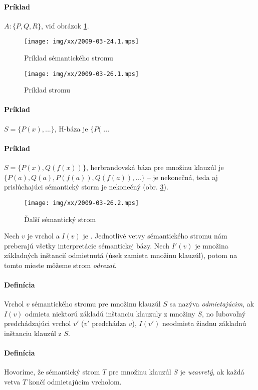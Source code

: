 \paragraph{Príklad} $A: \{ P, Q, R \}$, viď obrázok
\ref{fig-semantic_tree_example}.
\begin{figure}[h]
	\caption{Príklad sémantického stromu}
	\centering\texttt{[image: img/xx/2009-03-24.1.mps]}
	\label{fig-semantic_tree_example}
\end{figure}



\begin{figure}[h]
	\centering\texttt{[image: img/xx/2009-03-26.1.mps]}
	\caption{Príklad stromu}
	\label{0326_tree1}
\end{figure}
\paragraph{Príklad}
$S=\{P(x), ... \}$, H-báza je $\{P($ ... \todo{}

\paragraph{Príklad} $S=\{P(x), Q(f(x)) \}$, herbrandovská báza pre množinu
klauzúl je $\{ P(a), Q(a), P(f(a)), Q(f(a)), \ldots \}$ -- je nekonečná, teda aj
prislúchajúci sémantický storm je nekonečný (obr. \ref{0326_tree2}). %
\begin{figure}[h]
	\centering\texttt{[image: img/xx/2009-03-26.2.mps]}
	\caption{Ďalší sémantický strom}
	\label{0326_tree2}
\end{figure}

Nech $v$ je vrchol a $I(v)$ je \todo{}. Jednotlivé vetvy sémantického stromu nám
preberajú všetky interpretácie sémantickej bázy. Nech $I'(v)$ je množina
základných inštancií odmietnutá (úsek zamieta množinu klauzúl), potom na tomto
mieste môžeme strom \emph{odrezať}.

\paragraph{Definícia} Vrchol $v$ sémantického stromu pre množinu klauzúl $S$ sa
nazýva \emph{odmietajúcim}, ak  $I(v)$ odmieta niektorú základú inštanciu
klauzuly z množiny $S$, no ľubovoľný predchádzajúci vrchol $v'$ ($v'$ predchádza
$v$), $I(v')$ neodmieta žiadnu základnú inštanciu klauzúl z $S$.

\paragraph{Definícia}  Hovoríme, že sémantický strom $T$ pre množinu klauzúl $S$
je \emph{uzavretý}, ak každá vetva $T$ končí odmietajúcim vrcholom.

